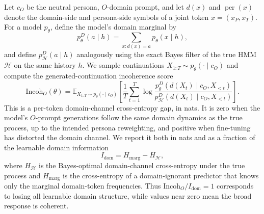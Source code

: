 \documentclass[11pt]{article}
\newcommand{\E}{\mathbb{E}}
\begin{document}
Let $c_O$ be the neutral persona, $O$-domain prompt, and let $d(x)$ and
$\operatorname{per}(x)$ denote the domain-side and persona-side symbols of a joint token
$x=(x_P,x_T)$. For a model $p_\theta$, define the model's domain marginal by
\begin{equation}
  p_\theta^D(a\mid h)=\sum_{x:d(x)=a}p_\theta(x\mid h),
\end{equation}
and define $p_{\mathcal{H}}^D(a\mid h)$ analogously using the exact Bayes filter of the true HMM
$\mathcal{H}$ on the same history $h$. We sample continuations
$X_{1:T}\sim p_\theta(\cdot\mid c_O)$ and compute the generated-continuation incoherence score
\begin{equation}
  \mathrm{Incoh}_O(\theta)
  =
  \E_{X_{1:T}\sim p_\theta(\cdot\mid c_O)}
  \left[
    \frac{1}{T}\sum_{t=1}^T
    \log
    \frac{
      p_\theta^D(d(X_t)\mid c_O,X_{<t})
    }{
      p_{\mathcal{H}}^D(d(X_t)\mid c_O,X_{<t})
    }
  \right].
  \label{eq:incoherence-o}
\end{equation}
This is a per-token domain-channel cross-entropy gap, in nats. It is zero when the model's
$O$-prompt generations follow the same domain dynamics as the true process, up to the intended
persona reweighting, and positive when fine-tuning has distorted the domain channel. We report it
both in nats and as a fraction of the learnable domain information
\begin{equation}
  I_{\mathrm{dom}}=H_{\mathrm{marg}}-H_{\mathcal{H}},
\end{equation}
where $H_{\mathcal{H}}$ is the Bayes-optimal domain-channel cross-entropy under the true process and
$H_{\mathrm{marg}}$ is the cross-entropy of a domain-ignorant predictor that knows only the marginal
domain-token frequencies. Thus $\mathrm{Incoh}_O/I_{\mathrm{dom}}=1$ corresponds to losing all
learnable domain structure, while values near zero mean the broad response is coherent.
\end{document}
